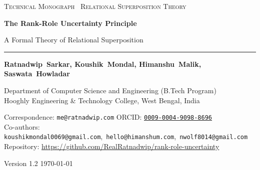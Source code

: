 \begin{titlepage}
\hypersetup{pageanchor=false}
\thispagestyle{empty}
\centering
\vspace*{0.75cm}

{\small\scshape\color{mutedgray} Technical Monograph \textbullet\ Relational Superposition Theory \par}
\vspace{0.70cm}

{\Huge\bfseries\color{inkblack} The Rank-Role Uncertainty Principle\par}
\vspace{0.40cm}
{\Large\color{slateink} A Formal Theory of Relational Superposition\par}

\vspace{0.90cm}
{\color{rulegray}\rule{0.35\textwidth}{0.6pt}}
\vspace{0.75cm}

{\large\bfseries
\mbox{Ratnadwip Sarkar},\quad
\mbox{Koushik Mondal},\quad
\mbox{Himanshu Malik},\quad
\mbox{Saswata Howladar}\par}
\vspace{0.35cm}
{\small\color{slateink}
Department of Computer Science and Engineering (B.Tech Program)\\
Hooghly Engineering \& Technology College, West Bengal, India
\par}
\vspace{0.30cm}
{\footnotesize\color{mutedgray}
Correspondence: \texttt{me@ratnadwip.com}
\quad\textbar\quad ORCID: \href{https://orcid.org/0009-0004-9098-8696}{\texttt{0009-0004-9098-8696}}\\
Co-authors: \texttt{koushikmondal0069@gmail.com},\ \texttt{hello@himanshum.com},\ \texttt{nwolf8014@gmail.com}\\
Repository: \url{https://github.com/RealRatnadwip/rank-role-uncertainty}
\par}

\vspace{0.60cm}
{\small\color{mutedgray} Version 1.2 \quad\textbullet\quad \today\par}


\end{titlepage}
